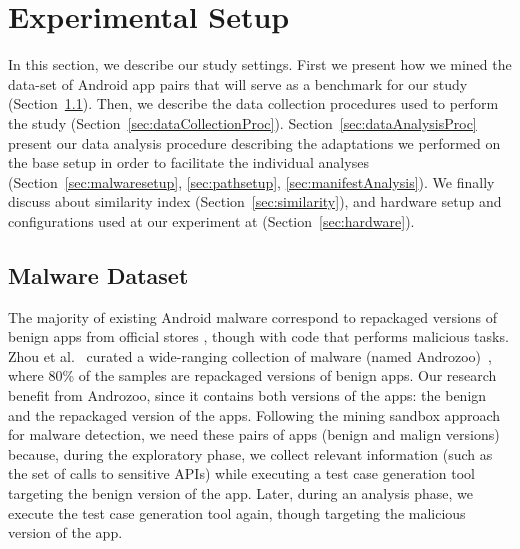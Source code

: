 \section{Experimental Setup}\label{sec:experimentalSetup}


In this section, we describe our study settings. First we present how we mined the data-set of Android app pairs that will serve as a benchmark for our study (Section~\ref{sec:dataset}).  Then, we describe the data collection procedures used to perform the study (Section~\ref{sec:dataCollectionProc}). Section~\ref{sec:dataAnalysisProc} present our data analysis procedure describing the adaptations we performed on the base setup in order to facilitate the individual analyses (Section~\ref{sec:malwaresetup}, \ref{sec:pathsetup}, \ref{sec:manifestAnalysis}). We finally discuss about similarity index (Section~\ref{sec:similarity}), and hardware setup and configurations used at our experiment at (Section~\ref{sec:hardware}).


\subsection{Malware Dataset}\label{sec:dataset}

The majority of existing Android malware correspond to repackaged versions of benign apps from official stores\cite{DBLP:conf/codaspy/ZhouZJN12} 
, though with code that performs malicious tasks. Zhou et al.~\cite{DBLP:conf/sp/ZhouJ12} curated a wide-ranging collection of malware (named Androzoo)~\cite{DBLP:conf/msr/AllixBKT16}, where 80\% of the samples are repackaged versions of benign apps. Our research benefit from Androzoo, since it contains both versions of the apps: the benign and the repackaged version of the apps. Following the mining sandbox approach for malware detection, we need these pairs of apps (benign and malign versions) because, during the exploratory phase, we collect relevant information (such as the set of calls to sensitive APIs) while executing a test case generation tool targeting the benign version of the app. Later, during an analysis phase, we execute the test case generation tool again, though targeting the malicious version of the app.


